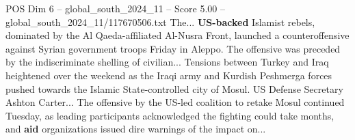 \begin{textsample}{POS Dim 6 – global\_south\_2024\_11 – Score 5.00 – global\_south\_2024\_11/117670506.txt}
The... \textbf{US-backed} Islamist rebels, dominated by the Al Qaeda-affiliated Al-Nusra Front, launched a counteroffensive against Syrian government troops Friday in Aleppo.
The offensive was preceded by the indiscriminate shelling of civilian...
Tensions between Turkey and Iraq heightened over the weekend as the Iraqi army and Kurdish Peshmerga forces pushed towards the Islamic State-controlled city of Mosul.
US Defense Secretary Ashton Carter...
The offensive by the US-led coalition to retake Mosul continued Tuesday, as leading participants acknowledged the fighting could take months, and \textbf{aid} organizations issued dire warnings of the impact on...

\end{textsample}
